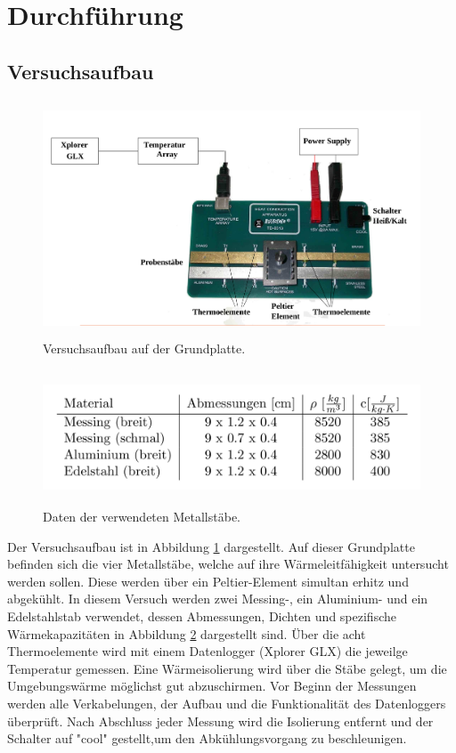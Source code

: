 \section{Durchführung}
\label{sec:Durchführung}

\subsection{Versuchsaufbau}

\begin{figure}
\centering
\includegraphics[height=7cm]{data/Bild2.png}
\caption{Versuchsaufbau auf der Grundplatte.}
\label{fig:aufbau}
\end{figure}


\begin{figure}
\centering
\includegraphics[height=4cm]{data/Bild1.png}
\caption{Daten der verwendeten Metallstäbe.}
\label{fig:daten}
\end{figure}

Der Versuchsaufbau ist in Abbildung \ref{fig:aufbau} dargestellt. Auf dieser Grundplatte befinden sich die vier Metallstäbe, welche auf ihre Wärmeleitfähigkeit untersucht werden sollen. Diese werden über ein Peltier-Element simultan erhitz und abgekühlt. In diesem Versuch werden zwei Messing-, ein Aluminium- und ein Edelstahlstab verwendet, dessen Abmessungen, Dichten und spezifische Wärmekapazitäten in Abbildung \ref{fig:daten} dargestellt sind. Über die acht Thermoelemente wird mit einem Datenlogger (Xplorer GLX) die jeweilge Temperatur gemessen. Eine Wärmeisolierung wird über die Stäbe gelegt, um die Umgebungswärme möglichst gut abzuschirmen.
Vor Beginn der Messungen werden alle Verkabelungen, der Aufbau und die Funktionalität des Datenloggers überprüft. Nach Abschluss jeder Messung wird die Isolierung entfernt und der Schalter auf "cool" gestellt,um den Abkühlungsvorgang zu beschleunigen. 


